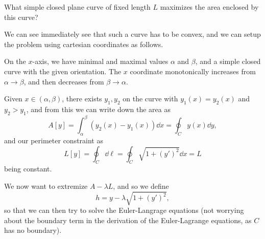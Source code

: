 \documentclass[a4paper]{scrartcl}
\begin{document}
\begin{example}
	What simple closed plane curve of fixed length $L$ maximizes the area enclosed by this curve?

	We can see immediately see that such a curve has to be convex, and we can setup the problem using cartesian coordinates as follows.

	\begin{center}
	\end{center}
	On the $x$-axis, we have minimal and maximal values $\alpha$ and $\beta$, and a simple closed curve with the given orientation. The $x$ coordinate monotonically increases from $\alpha \to \beta$, and then decreases from $\beta \to \alpha$.
	
	Given $x \in (\alpha, \beta)$, there exists $y_1, y_2$ on the curve with $y_1(x) = y_2(x)$ and $y_2 > y_1$, and from this we can write down the area as 
	$$
	A[y] = \int_{\alpha}^{\beta} (y_2(x) - y_1(x)) \dd x = \oint_C y(x) \dd y,
	$$
	and our perimeter constraint as
	$$
	L[y] = \oint_C \dd \ell = \oint_C \sqrt{1 + (y')^2} \dd x = L
	$$
	being constant.

	We now want to extremize $A - \lambda L$, and so we define 
	$$
	h = y - \lambda \sqrt{1 + (y')^2},
	$$
	so that we can then try to solve the Euler-Langrage equations (not worrying about the boundary term in the derivation of the Euler-Lagrange equations, as $C$ has no boundary).


\end{example}
\end{document}
